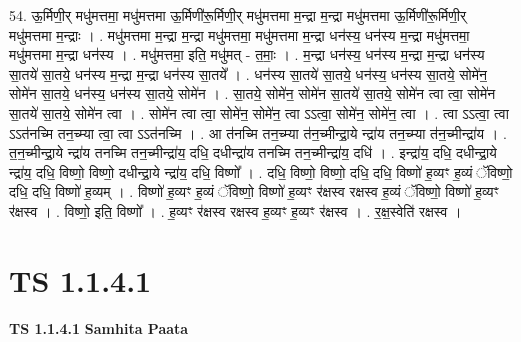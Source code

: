 \documentclass[17pt]{extarticle}
\begin{document}
54. ऊ॒र्मिणी॒र् मधु॑मत्तमा॒ मधु॑मत्तमा ऊ॒र्मिणी॑रू॒र्मिणी॒र् मधु॑मत्तमा म॒न्द्रा म॒न्द्रा मधु॑मत्तमा ऊ॒र्मिणी॑रू॒र्मिणी॒र् मधु॑मत्तमा म॒न्द्राः । . मधु॑मत्तमा म॒न्द्रा म॒न्द्रा मधु॑मत्तमा॒ मधु॑मत्तमा म॒न्द्रा धन॑स्य॒ धन॑स्य म॒न्द्रा मधु॑मत्तमा॒ मधु॑मत्तमा म॒न्द्रा धन॑स्य । . मधु॑मत्तमा॒ इति॒ मधु॑मत् - त॒माः॒ । . म॒न्द्रा धन॑स्य॒ धन॑स्य म॒न्द्रा म॒न्द्रा धन॑स्य सा॒तये॑ सा॒तये॒ धन॑स्य म॒न्द्रा म॒न्द्रा धन॑स्य सा॒तये᳚ । . धन॑स्य सा॒तये॑ सा॒तये॒ धन॑स्य॒ धन॑स्य सा॒तये॒ सोमे॑न॒ सोमे॑न सा॒तये॒ धन॑स्य॒ धन॑स्य सा॒तये॒ सोमे॑न । . सा॒तये॒ सोमे॑न॒ सोमे॑न सा॒तये॑ सा॒तये॒ सोमे॑न त्वा त्वा॒ सोमे॑न सा॒तये॑ सा॒तये॒ सोमे॑न त्वा । . सोमे॑न त्वा त्वा॒ सोमे॑न॒ सोमे॑न॒ त्वा ऽऽत्वा॒ सोमे॑न॒ सोमे॑न॒ त्वा । . त्वा ऽऽत्वा॒ त्वा ऽऽत॑नच्मि तन॒च्म्या त्वा॒ त्वा ऽऽत॑नच्मि । . आ त॑नच्मि तन॒च्म्या त॑न॒च्मीन्द्रा॒ये न्द्रा॑य तन॒च्म्या त॑न॒च्मीन्द्रा॑य । . त॒न॒च्मीन्द्रा॒ये न्द्रा॑य तनच्मि तन॒च्मीन्द्रा॑य॒ दधि॒ दधीन्द्रा॑य तनच्मि तन॒च्मीन्द्रा॑य॒ दधि॑ । . इन्द्रा॑य॒ दधि॒ दधीन्द्रा॒ये न्द्रा॑य॒ दधि॒ विष्णो॒ विष्णो॒ दधीन्द्रा॒ये न्द्रा॑य॒ दधि॒ विष्णो᳚ । . दधि॒ विष्णो॒ विष्णो॒ दधि॒ दधि॒ विष्णो॑ ह॒व्यꣳ ह॒व्यं ॅविष्णो॒ दधि॒ दधि॒ विष्णो॑ ह॒व्यम् । . विष्णो॑ ह॒व्यꣳ ह॒व्यं ॅविष्णो॒ विष्णो॑ ह॒व्यꣳ र॑क्षस्व रक्षस्व ह॒व्यं ॅविष्णो॒ विष्णो॑ ह॒व्यꣳ र॑क्षस्व । . विष्णो॒ इति॒ विष्णो᳚ । . ह॒व्यꣳ र॑क्षस्व रक्षस्व ह॒व्यꣳ ह॒व्यꣳ र॑क्षस्व । . र॒क्ष॒स्वेति॑ रक्षस्व । \newline
\pagebreak
{}

\section{ TS 1.1.4.1 }

\textbf{TS 1.1.4.1 } \newline
\textbf{Samhita Paata} \newline
\end{document}
